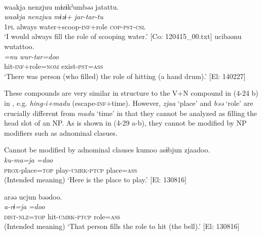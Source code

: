 \ex{}\\
\glll     waakja  {\textbar}nenzjuu{\textbar}  mɨzɨkˀumbəə  jatattu.\\
      \textit{waakja}  \textit{nenzjuu}  \textit{mɨzɨ+}  \textit{jar-tar-tu}\\
      1\textsc{pl}  always  water+scoop-\textsc{inf}+role  \textsc{cop}-\textsc{pst}-\textsc{csl}\\
      \glt       ‘I would always fill the role of scooping water.’ [Co: 120415\_00.txt]
\ex %
\glll   ucibəənu  wutattoo.\\
      \textit{=nu}  \textit{wur-tar=doo}\\
      hit-\textsc{inf}+role=\textsc{nom}  exist-\textsc{pst}=\textsc{ass}\\
      \glt       ‘There was person (who filled) the role of hitting (a hand drum).’ [El: 140227]
    \z
\z

These compounds are very similar in structure to the V+N compound in (4-24 b) in , e.g. \textit{hing-i+madu} (escape-\textsc{inf}+time). However, \textit{zjaa} ‘place’ and \textit{bəə} ‘role’ are crucially different from \textit{madu} ‘time’ in that they cannot be analyzed as filling the head slot of an NP. As is shown in (4-29 a-b), they cannot be modified by NP modifiers such as adnominal clasues.

\ea  Cannot be modified by adnominal clauses \label{ex:4.29}
\ea\label{ex:4.29a}
\glll   *kumoo  asɨbjun  zjaadoo.\\
       \textit{ku-ma=ja}  \textit{}  \textit{=doo}\\
      \textsc{prox}-place=\textsc{top}  play-\textsc{umrk}-\textsc{ptcp}  place=\textsc{ass}\\
      \glt       (Intended meaning) ‘Here is the place to play.’ [El: 130816]

\ex\label{ex:4.29b} %
\glll  *arəə  ucjun  bəədoo.\\
       \textit{a-rɨ=ja}  \textit{}  \textit{=doo}\\
       \textsc{dist}-\textsc{nlz}=\textsc{top}  hit-\textsc{umrk}-\textsc{ptcp}  role=\textsc{ass}\\
      \glt       (Intended meaning) ‘That person fills the role to hit (the bell).’ [El: 130816]
    \z
\z

